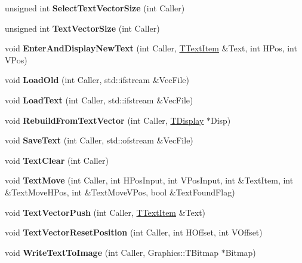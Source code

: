 \begin{DoxyCompactItemize}
unsigned int {\bfseries Select\+Text\+Vector\+Size} (int Caller)
\item 
\mbox{\label{class_t_text_handler_a7dfd4e30235878fb01e7387715e0cb0f}} 
unsigned int {\bfseries Text\+Vector\+Size} (int Caller)
\item 
\mbox{\label{class_t_text_handler_aee76a9b018b4c80da351f4cb43172681}} 
void {\bfseries Enter\+And\+Display\+New\+Text} (int Caller, \mbox{\hyperlink{class_t_text_item}{T\+Text\+Item}} \&Text, int H\+Pos, int V\+Pos)
\item 
\mbox{\label{class_t_text_handler_ae37cbe9dbbc17228e37d8ce2626e176f}} 
void {\bfseries Load\+Old} (int Caller, std\+::ifstream \&Vec\+File)
\item 
\mbox{\label{class_t_text_handler_ab67bb7278c89557bf9cc8bef475afab5}} 
void {\bfseries Load\+Text} (int Caller, std\+::ifstream \&Vec\+File)
\item 
\mbox{\label{class_t_text_handler_a30f32d9d3267bc8c90298e0ecd3c26fd}} 
void {\bfseries Rebuild\+From\+Text\+Vector} (int Caller, \mbox{\hyperlink{class_t_display}{T\+Display}} $\ast$Disp)
\item 
\mbox{\label{class_t_text_handler_a07441155bee467c9fb111b8332681466}} 
void {\bfseries Save\+Text} (int Caller, std\+::ofstream \&Vec\+File)
\item 
\mbox{\label{class_t_text_handler_ae50027851479dd0f362a75abad793e7a}} 
void {\bfseries Text\+Clear} (int Caller)
\item 
\mbox{\label{class_t_text_handler_ad8129c58cfa1ecad2fc343efdb96eb5e}} 
void {\bfseries Text\+Move} (int Caller, int H\+Pos\+Input, int V\+Pos\+Input, int \&Text\+Item, int \&Text\+Move\+H\+Pos, int \&Text\+Move\+V\+Pos, bool \&Text\+Found\+Flag)
\item 
\mbox{\label{class_t_text_handler_a4fd922e73622bb8e2c21d219e977aa0a}} 
void {\bfseries Text\+Vector\+Push} (int Caller, \mbox{\hyperlink{class_t_text_item}{T\+Text\+Item}} \&Text)
\item 
\mbox{\label{class_t_text_handler_a599c1a13d78b63a18ebc17550dfa9a0d}} 
void {\bfseries Text\+Vector\+Reset\+Position} (int Caller, int H\+Offset, int V\+Offset)
\item 
\mbox{\label{class_t_text_handler_a7d202827ae62cd288a07431579977539}} 
void {\bfseries Write\+Text\+To\+Image} (int Caller, Graphics\+::\+T\+Bitmap $\ast$Bitmap)
\end{DoxyCompactItemize}
